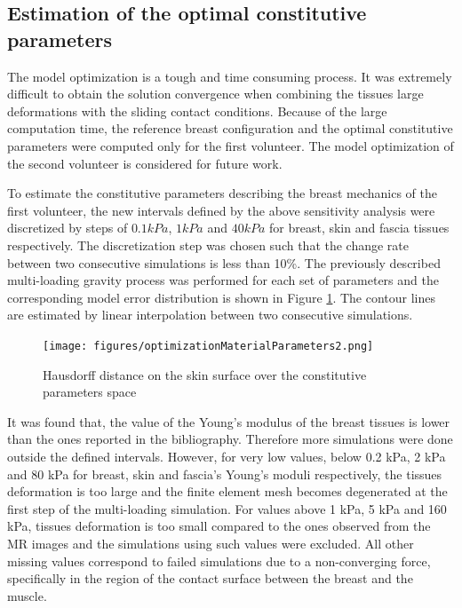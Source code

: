 \subsection{Estimation of the optimal constitutive parameters}

The model optimization is a tough and time consuming process. It was extremely difficult to obtain the solution convergence when combining the tissues large deformations with the sliding contact conditions. Because of the large computation time, the reference breast configuration and the optimal constitutive parameters were computed only for the first volunteer. The model optimization of the second volunteer is considered for future work.

To estimate the constitutive parameters describing the breast mechanics of the first volunteer, the new intervals defined by the above sensitivity analysis were discretized by steps of $0.1 kPa$, $1kPa$ and $40 kPa$ for breast, skin and fascia tissues respectively. The discretization step was chosen such that the change rate between two consecutive simulations is less than 10\%. The previously described multi-loading gravity process was performed for each set of parameters and the corresponding model error distribution is shown in  Figure \ref{fig:optimizationresults}. The contour lines are estimated by linear interpolation between two consecutive simulations.

\begin{figure}[!h]
\centering
\texttt{[image: figures/optimizationMaterialParameters2.png]} 
\caption{Hausdorff distance on the skin surface over the constitutive parameters space}\label{fig:optimizationresults}
\end{figure}

It was found that, the value of the Young's modulus of the breast tissues is lower than the ones reported in the bibliography. Therefore more simulations were done outside the defined intervals. However, for very low values, below 0.2 kPa, 2 kPa and 80 kPa for breast, skin and fascia's Young's moduli respectively, the tissues deformation is too large and the finite element mesh becomes degenerated at the first step of the multi-loading simulation. For values above 1 kPa, 5 kPa and 160 kPa, tissues deformation is too small compared to the ones observed from the MR images and the simulations using such values were excluded. All other missing values correspond to failed simulations due to a non-converging force, specifically in the region of the contact surface between the breast and the muscle.


